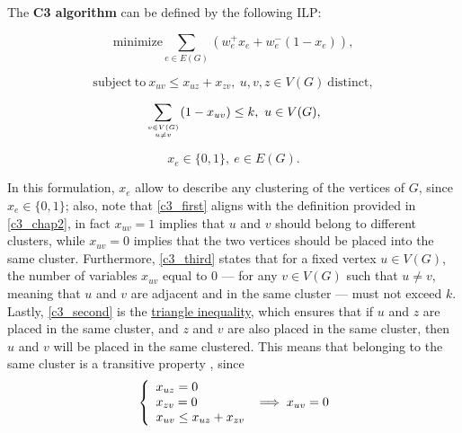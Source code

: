 \begin{definition}[C3's ILP] \label{c3_ilp}
    The \textbf{C3 algorithm} can be defined by the following ILP:

    \begin{equation} \label{c3_first}
        \mathrm{minimize} \sum_{e \in E(G)} (w_e^+x_e + w_e^-(1 - x_e)),
    \end{equation}

    \begin{equation} \label{c3_second}
        \mathrm{subject \ to \ } x_{uv} \le x_{uz} + x_{zv}, \ u, v, z \in V(G) \mathrm{\ distinct},
    \end{equation}

    \begin{equation} \label{c3_third}
        \sum_{v \in V(G) \atop u \neq v} (1 - x_{uv}) \le k, \ u \in V(G),
    \end{equation}

    \begin{equation} \label{c3_fourth}
        x_e \in \{0, 1\}, \ e \in E(G).
    \end{equation}
\end{definition}

In this formulation, $x_e$ allow to describe any clustering of the vertices of $G$, since $x_e \in \{0, 1\}$; also, note that \cref{c3_first} aligns with the definition provided in \cref{c3_chap2}, in fact $x_{uv} = 1$ implies that $u$ and $v$ should belong to different clusters, while $x_{uv} = 0$ implies that the two vertices should be placed into the same cluster. Furthermore, \cref{c3_third} states that for a fixed vertex $u \in V(G)$, the number of variables $x_{uv}$ equal to 0 --- for any $v \in V(G)$ such that $u \neq v$, meaning that $u$ and $v$ are adjacent and in the same cluster --- must not exceed $k$. Lastly, \cref{c3_second} is the \href{https://en.wikipedia.org/wiki/Triangle_inequality}{triangle inequality}, which ensures that if $u$ and $z$ are placed in the same cluster, and $z$ and $v$ are also placed in the same cluster, then $u$ and $v$ will be placed in the same clustered. This means that belonging to the same cluster is a transitive property , since $$\soe{l}{x_{uz} = 0 \\ x_{zv} = 0 \\ x_{uv} \le x_{uz} + x_{zv}} \implies x_{uv} = 0$$

